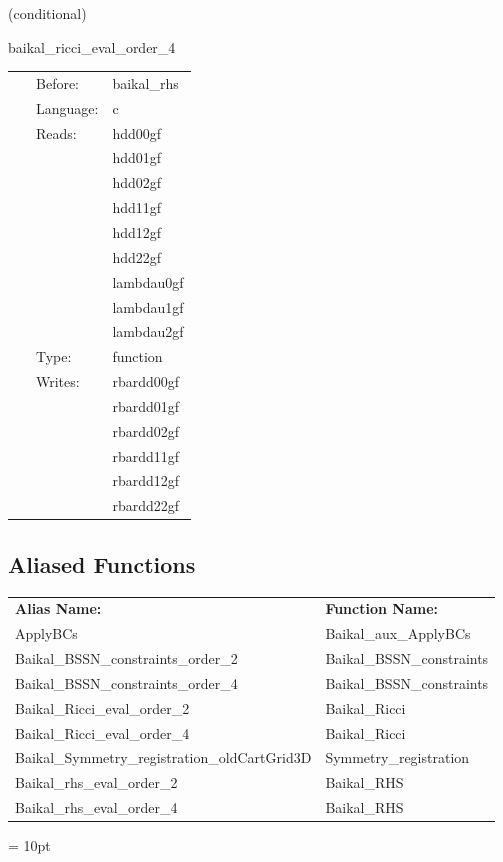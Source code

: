 \vspace{5mm}

   (conditional) 

\hspace{5mm} baikal\_ricci\_eval\_order\_4 

\hspace{5mm}{\it compute ricci tensor, needed for bssn rhss, at finite-differencing order 4 } 


\hspace{5mm}

 \begin{tabular*}{160mm}{cll} 
~ & Before:  & baikal\_rhs \\ 
~ & Language:  & c \\ 
~ & Reads:  & hdd00gf \\ 
~& ~ &hdd01gf\\ 
~& ~ &hdd02gf\\ 
~& ~ &hdd11gf\\ 
~& ~ &hdd12gf\\ 
~& ~ &hdd22gf\\ 
~& ~ &lambdau0gf\\ 
~& ~ &lambdau1gf\\ 
~& ~ &lambdau2gf\\ 
~ & Type:  & function \\ 
~ & Writes:  & rbardd00gf \\ 
~& ~ &rbardd01gf\\ 
~& ~ &rbardd02gf\\ 
~& ~ &rbardd11gf\\ 
~& ~ &rbardd12gf\\ 
~& ~ &rbardd22gf\\ 
\end{tabular*} 


\subsection*{Aliased Functions}

\hspace{5mm}

 \begin{tabular*}{160mm}{ll} 

{\bf Alias Name:} ~~~~~~~ & {\bf Function Name:} \\ 
ApplyBCs & Baikal\_aux\_ApplyBCs \\ 
Baikal\_BSSN\_constraints\_order\_2 & Baikal\_BSSN\_constraints \\ 
Baikal\_BSSN\_constraints\_order\_4 & Baikal\_BSSN\_constraints \\ 
Baikal\_Ricci\_eval\_order\_2 & Baikal\_Ricci \\ 
Baikal\_Ricci\_eval\_order\_4 & Baikal\_Ricci \\ 
Baikal\_Symmetry\_registration\_oldCartGrid3D & Symmetry\_registration \\ 
Baikal\_rhs\_eval\_order\_2 & Baikal\_RHS \\ 
Baikal\_rhs\_eval\_order\_4 & Baikal\_RHS \\ 
\end{tabular*} 



\vspace{5mm}\parskip = 10pt 
